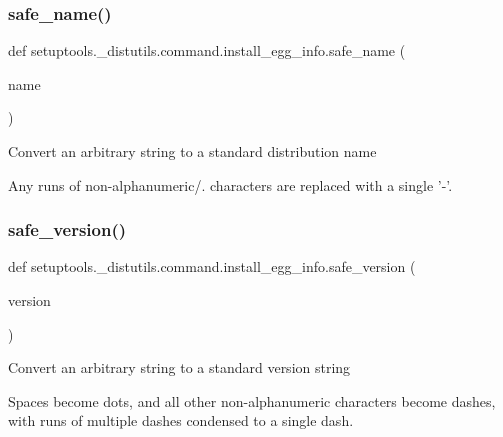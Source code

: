 \subsubsection{\texorpdfstring{safe\+\_\+name()}{safe\_name()}}
{\footnotesize\ttfamily def setuptools.\+\_\+distutils.\+command.\+install\+\_\+egg\+\_\+info.\+safe\+\_\+name (\begin{DoxyParamCaption}\item[{}]{name }\end{DoxyParamCaption})}

\begin{DoxyVerb}Convert an arbitrary string to a standard distribution name

Any runs of non-alphanumeric/. characters are replaced with a single '-'.
\end{DoxyVerb}
 \mbox{\label{namespacesetuptools_1_1__distutils_1_1command_1_1install__egg__info_a933540b914ceda8116584c9ba792206d}} 
\subsubsection{\texorpdfstring{safe\+\_\+version()}{safe\_version()}}
{\footnotesize\ttfamily def setuptools.\+\_\+distutils.\+command.\+install\+\_\+egg\+\_\+info.\+safe\+\_\+version (\begin{DoxyParamCaption}\item[{}]{version }\end{DoxyParamCaption})}

\begin{DoxyVerb}Convert an arbitrary string to a standard version string

Spaces become dots, and all other non-alphanumeric characters become
dashes, with runs of multiple dashes condensed to a single dash.
\end{DoxyVerb}
 \mbox{\label{namespacesetuptools_1_1__distutils_1_1command_1_1install__egg__info_ad2e5420c2c1e3ae8af83a2b230873be4}} 
